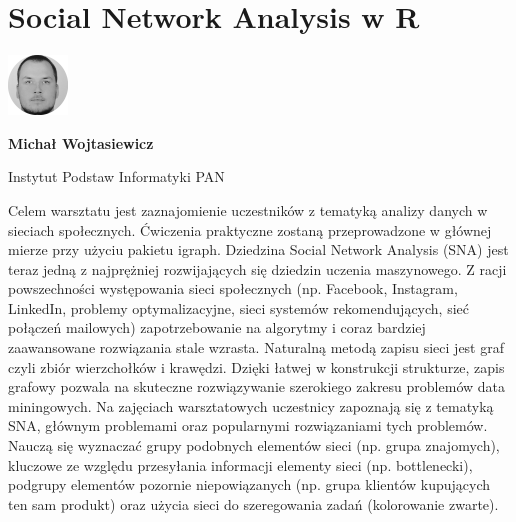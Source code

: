 \documentclass[\main/boa.tex]{subfiles}
\begin{document}
\section{Social Network Analysis w R}
\begin{minipage}[t]{0.915\textwidth}
	\center     
    \includegraphics[width=60px]{img/workshops/czarno_biale/pwojtasiewicz-crop.png} 
\end{minipage}

\begin{minipage}{0.915\textwidth}
\centering
{\bf {} Michał Wojtasiewicz}
\end{minipage}

\vskip 0.3cm

\begin{affiliations}
\begin{minipage}{0.915\textwidth}
\centering
\large Instytut Podstaw Informatyki PAN  \\[2pt]
\end{minipage}
\end{affiliations}

\vskip 0.8cm

\opiswarsztatu Celem warsztatu jest zaznajomienie uczestników z tematyką analizy danych w sieciach społecznych. Ćwiczenia praktyczne zostaną przeprowadzone w głównej mierze przy użyciu pakietu igraph. Dziedzina Social Network Analysis (SNA) jest teraz jedną z najprężniej rozwijających się dziedzin uczenia maszynowego. Z racji powszechności występowania sieci społecznych (np. Facebook, Instagram, LinkedIn, problemy optymalizacyjne, sieci systemów rekomendujących, sieć połączeń mailowych) zapotrzebowanie na algorytmy i coraz bardziej zaawansowane rozwiązania stale wzrasta. Naturalną metodą zapisu sieci jest graf czyli zbiór wierzchołków i krawędzi. Dzięki łatwej w konstrukcji strukturze, zapis grafowy pozwala na skuteczne rozwiązywanie szerokiego zakresu problemów data miningowych. Na zajęciach warsztatowych uczestnicy zapoznają się z tematyką SNA, głównym problemami oraz popularnymi rozwiązaniami tych problemów. Nauczą się wyznaczać grupy podobnych elementów sieci (np. grupa znajomych), kluczowe ze względu przesyłania informacji elementy sieci (np. bottlenecki), podgrupy elementów pozornie niepowiązanych (np. grupa klientów kupujących ten sam produkt) oraz użycia sieci do szeregowania zadań (kolorowanie zwarte).
\end{document}
